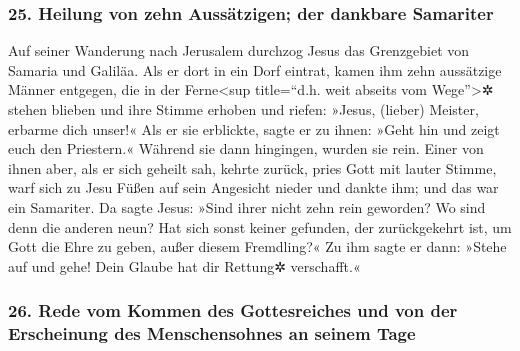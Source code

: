 \hypertarget{heilung-von-zehn-aussuxe4tzigen-der-dankbare-samariter}{%
\subsubsection{25. Heilung von zehn Aussätzigen; der dankbare
Samariter}\label{heilung-von-zehn-aussuxe4tzigen-der-dankbare-samariter}}

 Auf seiner Wanderung nach Jerusalem durchzog Jesus das
Grenzgebiet von Samaria und Galiläa.  Als er dort in ein
Dorf eintrat, kamen ihm zehn aussätzige Männer entgegen, die in der
Ferne\textless sup title=``d.h. weit abseits vom Wege''\textgreater✲
stehen blieben  und ihre Stimme erhoben und riefen:
»Jesus, (lieber) Meister, erbarme dich unser!«  Als er
sie erblickte, sagte er zu ihnen: »Geht hin und zeigt euch den
Priestern.« Während sie dann hingingen, wurden sie rein. 
Einer von ihnen aber, als er sich geheilt sah, kehrte zurück, pries Gott
mit lauter Stimme,  warf sich zu Jesu Füßen auf sein
Angesicht nieder und dankte ihm; und das war ein Samariter.
 Da sagte Jesus: »Sind ihrer nicht zehn rein geworden? Wo
sind denn die anderen neun?  Hat sich sonst keiner
gefunden, der zurückgekehrt ist, um Gott die Ehre zu geben, außer diesem
Fremdling?«  Zu ihm sagte er dann: »Stehe auf und gehe!
Dein Glaube hat dir Rettung✲ verschafft.«

\hypertarget{rede-vom-kommen-des-gottesreiches-und-von-der-erscheinung-des-menschensohnes-an-seinem-tage}{%
\subsubsection{26. Rede vom Kommen des Gottesreiches und von der
Erscheinung des Menschensohnes an seinem
Tage}\label{rede-vom-kommen-des-gottesreiches-und-von-der-erscheinung-des-menschensohnes-an-seinem-tage}}

